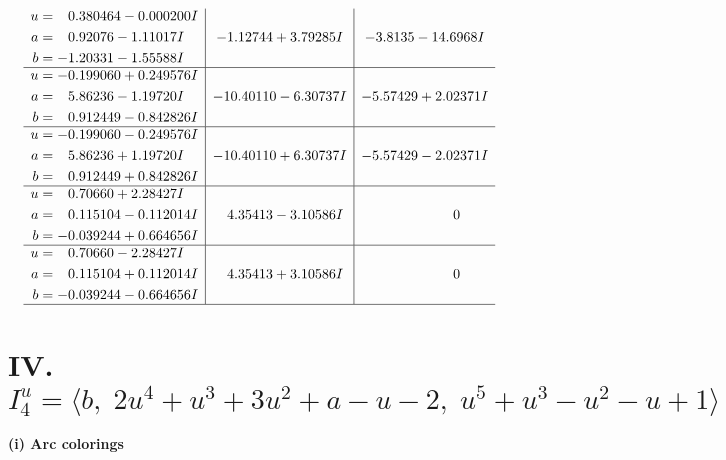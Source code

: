 \documentclass[1p]{elsarticle_modified}
\theoremstyle{definition}
\begin{document}
$$\begin{array}{c|c|c}
\begin{aligned}
u &= \phantom{-}0.380464 - 0.000200 I \\
a &= \phantom{-}0.92076 - 1.11017 I \\
b &= -1.20331 - 1.55588 I\end{aligned}
 & -1.12744 + 3.79285 I & -3.8135 - 14.6968 I \\ \hline\begin{aligned}
u &= -0.199060 + 0.249576 I \\
a &= \phantom{-}5.86236 - 1.19720 I \\
b &= \phantom{-}0.912449 - 0.842826 I\end{aligned}
 & -10.40110 - 6.30737 I & -5.57429 + 2.02371 I \\ \hline\begin{aligned}
u &= -0.199060 - 0.249576 I \\
a &= \phantom{-}5.86236 + 1.19720 I \\
b &= \phantom{-}0.912449 + 0.842826 I\end{aligned}
 & -10.40110 + 6.30737 I & -5.57429 - 2.02371 I \\ \hline\begin{aligned}
u &= \phantom{-}0.70660 + 2.28427 I \\
a &= \phantom{-}0.115104 - 0.112014 I \\
b &= -0.039244 + 0.664656 I\end{aligned}
 & \phantom{-}4.35413 - 3.10586 I & \phantom{-0.000000 } 0 \\ \hline\begin{aligned}
u &= \phantom{-}0.70660 - 2.28427 I \\
a &= \phantom{-}0.115104 + 0.112014 I \\
b &= -0.039244 - 0.664656 I\end{aligned}
 & \phantom{-}4.35413 + 3.10586 I & \phantom{-0.000000 } 0\\
 \hline 
 \end{array}$$\newpage\newpage\renewcommand{\arraystretch}{1}
\centering \section*{IV. $I^u_{4}= \langle b,\;2 u^4+u^3+3 u^2+a- u-2,\;u^5+u^3- u^2- u+1 \rangle$}
\flushleft \textbf{(i) Arc colorings}\\
\end{document}

